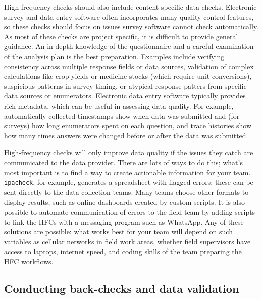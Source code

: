 High frequency checks should also include content-specific data checks.
Electronic survey and data entry software often incorporates many quality control features,
so these checks should focus on issues survey software cannot check automatically.
As most of these checks are project specific,
it is difficult to provide general guidance.
An in-depth knowledge of the questionnaire and a careful examination of the analysis plan
is the best preparation.
Examples include verifying consistency across multiple response fields or data sources,
validation of complex calculations like crop yields or medicine stocks (which require unit conversions),
suspicious patterns in survey timing,
or atypical response patters from specific data sources or enumerators.
Electronic data entry software typically provides rich metadata,
which can be useful in assessing data quality.
For example, automatically collected timestamps show when data was submitted
and (for surveys) how long enumerators spent on each question,
and trace histories show how many
times answers were changed before or after the data was submitted.

High-frequency checks will only improve data quality
if the issues they catch are communicated to the data provider.
There are lots of ways to do this;
what's most important is to find a way to create actionable information for your team.
\texttt{ipacheck}, for example, generates a spreadsheet with flagged errors;
these can be sent directly to the data collection teams.
Many teams choose other formats to display results,
such as online dashboards created by custom scripts.
It is also possible to automate communication of errors to the field team
by adding scripts to link the HFCs with a messaging program such as WhatsApp.
Any of these solutions are possible:
what works best for your team will depend on such variables as
cellular networks in field work areas, whether field supervisors have access to laptops,
internet speed, and coding skills of the team preparing the HFC workflows.

\subsection{Conducting back-checks and data validation}

